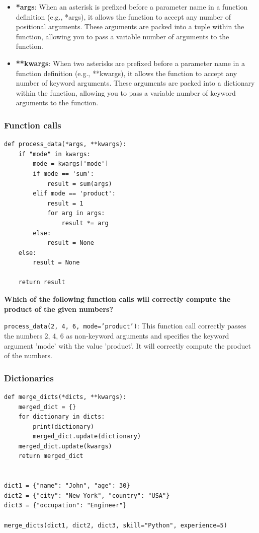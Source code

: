\begin{itemize}
    \item \textbf{*args}: When an asterisk is prefixed before a parameter name in a function definition (e.g., *args), it allows the function to accept any number of positional arguments. These arguments are packed into a tuple within the function, allowing you to pass a variable number of arguments to the function.
    \item \textbf{**kwargs}: When two asterisks are prefixed before a parameter name in a function definition (e.g., **kwargs), it allows the function to accept any number of keyword arguments. These arguments are packed into a dictionary within the function, allowing you to pass a variable number of keyword arguments to the function.
\end{itemize}

\subsubsection{Function calls}
\begin{codebox}
\begin{verbatim}
def process_data(*args, **kwargs):
    if "mode" in kwargs:
        mode = kwargs['mode']
        if mode == 'sum':
            result = sum(args)
        elif mode == 'product':
            result = 1
            for arg in args:
                result *= arg
        else:
            result = None
    else:
        result = None
 
    return result
\end{verbatim}
\end{codebox}
\textbf{Which of the following function calls will correctly compute the product of the given numbers?}

\texttt{process\_data(2, 4, 6, mode='product')}: This function call correctly passes the numbers 2, 4, 6 as non-keyword arguments and specifies the keyword argument 'mode' with the value 'product'. It will correctly compute the product of the numbers.

\newpage
\subsubsection{Dictionaries}
\begin{codebox}
\begin{verbatim}
def merge_dicts(*dicts, **kwargs):
    merged_dict = {}
    for dictionary in dicts:
        print(dictionary)
        merged_dict.update(dictionary)
    merged_dict.update(kwargs)
    return merged_dict


dict1 = {"name": "John", "age": 30}
dict2 = {"city": "New York", "country": "USA"}
dict3 = {"occupation": "Engineer"}
 
merge_dicts(dict1, dict2, dict3, skill="Python", experience=5)
\end{verbatim}
\end{codebox}

